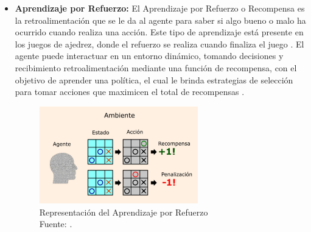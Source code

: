 \begin{itemize}
	\item \textbf{Aprendizaje por Refuerzo:} El Aprendizaje por Refuerzo o Recompensa es la retroalimentación que se le da al agente para saber si algo bueno o malo ha ocurrido cuando realiza una acción. Este tipo de aprendizaje está presente en los juegos de ajedrez, donde el refuerzo se realiza cuando finaliza el juego \parencite{bk_russell2004intart}. El agente puede interactuar en un entorno dinámico, tomando decisiones y recibimiento retroalimentación mediante una función de recompensa, con el objetivo de aprender una política, el cual le brinda estrategias de selección para tomar acciones que maximicen el total de recompensas \parencite{gl_cordis}.
	\begin{figure}[h]
		\begin{center}
			\includegraphics[width=0.65\textwidth]{2/MT/1.jpg}
			\caption{Representación del Aprendizaje por Refuerzo \\
				Fuente: \citep*{gl_ceupe}. }
			\label{1:fig2}
		\end{center}
	\end{figure}
	

\end{itemize}
